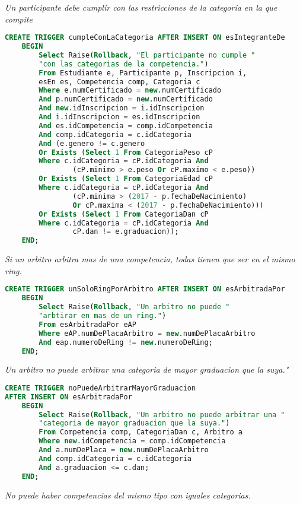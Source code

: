 \emph{Un participante debe cumplir con las restricciones de la categoría en la que compite}

\begin{lstlisting}[language=SQL]
CREATE TRIGGER cumpleConLaCategoria AFTER INSERT ON esIntegranteDe
    BEGIN
        Select Raise(Rollback, "El participante no cumple "
        "con las categorias de la competencia.")
        From Estudiante e, Participante p, Inscripcion i, 
        esEn es, Competencia comp, Categoria c
        Where e.numCertificado = new.numCertificado 
        And p.numCertificado = new.numCertificado 
        And new.idInscripcion = i.idInscripcion 
        And i.idInscripcion = es.idInscripcion 
        And es.idCompetencia = comp.idCompetencia 
        And comp.idCategoria = c.idCategoria
        And (e.genero != c.genero
        Or Exists (Select 1 From CategoriaPeso cP 
        Where c.idCategoria = cP.idCategoria And 
                (cP.minimo > e.peso Or cP.maximo < e.peso))
        Or Exists (Select 1 From CategoriaEdad cP 
        Where c.idCategoria = cP.idCategoria And 
                (cP.minima > (2017 - p.fechaDeNacimiento) 
                Or cP.maxima < (2017 - p.fechaDeNacimiento)))
        Or Exists (Select 1 From CategoriaDan cP 
        Where c.idCategoria = cP.idCategoria And 
                cP.dan != e.graduacion));
    END;

\end{lstlisting}
\emph{
  Si un arbitro arbitra mas de una competencia, todas tienen que ser en el mismo ring.
}

\begin{lstlisting}[language=SQL]
CREATE TRIGGER unSoloRingPorArbitro AFTER INSERT ON esArbitradaPor
    BEGIN
        Select Raise(Rollback, "Un arbitro no puede "
        "arbtirar en mas de un ring.")
        From esArbitradaPor eAP 
        Where eAP.numDePlacaArbitro = new.numDePlacaArbitro 
        And eap.numeroDeRing != new.numeroDeRing;
    END;

\end{lstlisting}
\emph{
  Un arbitro no puede arbitrar una categoria de mayor graduacion que la suya."
}

\begin{lstlisting}[language=SQL]
CREATE TRIGGER noPuedeArbitrarMayorGraduacion 
AFTER INSERT ON esArbitradaPor
    BEGIN
        Select Raise(Rollback, "Un arbitro no puede arbitrar una "
        "categoria de mayor graduacion que la suya.")
        From Competencia comp, CategoriaDan c, Arbitro a
        Where new.idCompetencia = comp.idCompetencia 
        And a.numDePlaca = new.numDePlacaArbitro 
        And comp.idCategoria = c.idCategoria 
        And a.graduacion <= c.dan;
    END;


\end{lstlisting}
\emph{
  No puede haber competencias del mismo tipo con iguales categorias.
}

